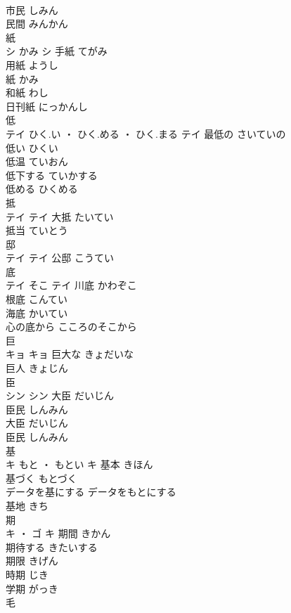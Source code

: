 \documentclass[8pt]{extreport}
\begin{document}
\begin{CJK}{UTF8}{min}
\\	市民	しみん	
\\	民間	みんかん	
\\	紙	
\\	シ	かみ	シ	手紙	てがみ	
\\	用紙	ようし	
\\	紙	かみ	
\\	和紙	わし	
\\	日刊紙	にっかんし	
\\	低	
\\	テイ	ひく.い ・ ひく.める ・ ひく.まる	テイ	最低の	さいていの	
\\	低い	ひくい	
\\	低温	ていおん	
\\	低下する	ていかする	
\\	低める	ひくめる	
\\	抵	
\\	テイ		テイ	大抵	たいてい	
\\	抵当	ていとう	
\\	邸	
\\	テイ		テイ													公邸	こうてい	
\\	底	
\\	テイ	そこ	テイ	川底	かわぞこ	
\\	根底	こんてい	
\\	海底	かいてい	
\\	心の底から	こころのそこから	
\\	巨	
\\	キョ		キョ	巨大な	きょだいな	
\\	巨人	きょじん	
\\	臣	
\\	シン		シン	大臣	だいじん	
\\	臣民	しんみん	
\\	大臣	だいじん	
\\	臣民	しんみん	
\\	基	
\\	キ	もと ・ もとい	キ	基本	きほん	
\\	基づく	もとづく	
\\	データを基にする	データをもとにする	
\\	基地	きち	
\\	期	
\\	キ ・ ゴ		キ	期間	きかん	
\\	期待する	きたいする	
\\	期限	きげん	
\\	時期	じき	
\\	学期	がっき	
\\	毛	

\end{CJK}
\end{document}

